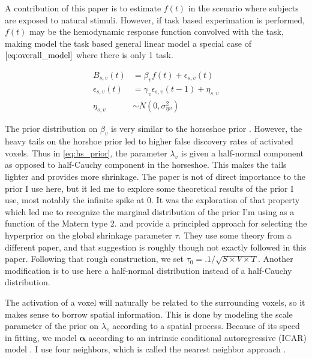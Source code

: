A contribution of this paper is to estimate $f(t)$ in the scenario where 
subjects are exposed to natural stimuli. However, if task based experimation
is performed, $f(t)$ may be the hemodynamic response function convolved with 
the task, making model the task based general linear model a special case of
$\ref{eq:overall_model}$ where there is only 1 task.

\begin{equation}
  \begin{aligned}
    B_{s,v} (t) &= \beta_{v} f(t) + \epsilon_{s,v}(t) \\
    \epsilon_{s,v} (t) &= \gamma_v \epsilon_{s,v} (t - 1) + \eta_{s,v} \\
    \eta_{s,v} &\sim N(0, \sigma^2_{\eta v})
  \end{aligned}
  \label{eq:overall_model}
\end{equation}


The prior distribution on $\beta_v$ is very similar to the horseshoe prior
\cite{carvalho2009handling,carvalho2010horseshoe}. However, the heavy tails
on the horshoe prior led to higher false discovery rates of activated voxels. 
Thus in \ref{eq:hs_prior}, the parameter $\lambda_v$ is given a half-normal
component as opposed to half-Cauchy component in the horseshoe. This makes the
tails lighter and provides more shrinkage. The paper 
\cite{bhadra2017horseshoe+} is not of direct importance to the prior I use here,
but it led me to explore some theoretical results of the prior I use, most 
notably the infinite spike at 0. It was the exploration of that property which 
led me to recognize the marginal distribution of the prior I'm using as a 
function of the Matern type 2. \cite{piironen2017hyperpriora} and 
\cite{piironen2017sparsityb} provide a principled approach for selecting the
hyperprior on the global shrinkage parameter $\tau$. They use some theory from
a different paper, and that suggestion is roughly though not 
exactly followed in this paper. Following that rough construction, 
we set $\tau_0 = .1/\sqrt{S\times V \times T}$. Another modification is to use
here a half-normal distribution instead of a half-Cauchy distribution. 

The activation of a voxel will naturally be related to the surrounding voxels,
so it makes sense to borrow spatial information. This is done by modeling the 
scale parameter of the prior on $\lambda_v$ according to a spatial process. 
Because of its speed in fitting, we model $\boldsymbol{\alpha}$ according to
an intrinsic conditional autoregressive (ICAR) model \cite{besag1974spatial}.
I use four neighbors, which is called the nearest neighbor approach 
\cite{besag1974}.


